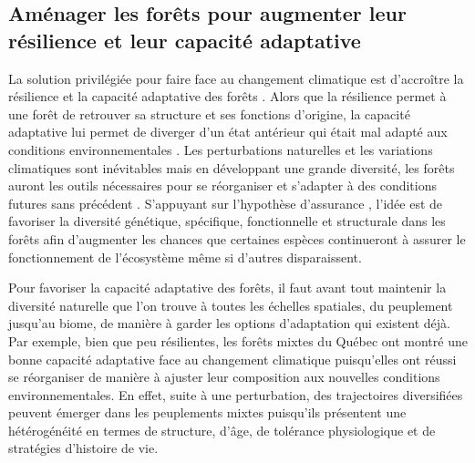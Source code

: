 \hypertarget{amuxe9nager-les-foruxeats-pour-augmenter-leur-ruxe9silience-et-leur-capacituxe9-adaptative}{%
\subsection{Aménager les forêts pour augmenter leur résilience et leur
capacité
adaptative}\label{amuxe9nager-les-foruxeats-pour-augmenter-leur-ruxe9silience-et-leur-capacituxe9-adaptative}}

La solution privilégiée pour faire face au changement climatique est
d'accroître la résilience et la capacité adaptative des forêts
\citep{messier_managing_2013, seastedt_management_2008}. Alors que la
résilience permet à une forêt de retrouver sa structure et ses fonctions
d'origine, la capacité adaptative lui permet de diverger d'un état
antérieur qui était mal adapté aux conditions environnementales
\citep{messier_managing_2013, filotas_viewing_2014}. Les perturbations
naturelles et les variations climatiques sont inévitables mais en
développant une grande diversité, les forêts auront les outils
nécessaires pour se réorganiser et s'adapter à des conditions futures
sans précédent \citep{messier_dealing_2016}. S'appuyant sur l'hypothèse
d'assurance \citep[de l'anglais \emph{insurance
hypothesis};][]{yachi_biodiversity_1999}, l'idée est de favoriser la
diversité génétique, spécifique, fonctionnelle et structurale dans les
forêts afin d'augmenter les chances que certaines espèces continueront à
assurer le fonctionnement de l'écosystème même si d'autres
disparaissent.

Pour favoriser la capacité adaptative des forêts, il faut avant tout
maintenir la diversité naturelle que l'on trouve à toutes les échelles
spatiales, du peuplement jusqu'au biome, de manière à garder les options
d'adaptation qui existent déjà. Par exemple, bien que peu résilientes,
les forêts mixtes du Québec ont montré une bonne capacité adaptative
face au changement climatique puisqu'elles ont réussi se réorganiser de
manière à ajuster leur composition aux nouvelles conditions
environnementales. En effet, suite à une perturbation, des trajectoires
diversifiées peuvent émerger dans les peuplements mixtes puisqu'ils
présentent une hétérogénéité en termes de structure, d'âge, de tolérance
physiologique et de stratégies d'histoire de vie.

